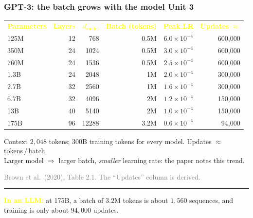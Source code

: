 \documentclass[12pt]{beamer}
\newcommand{\FrameTitle}[2]{\frametitle{#1 \hfill \small\textnormal{\textcolor{midgray}{#2}}}}
\begin{document}
\begin{frame}\FrameTitle{GPT-3: the batch grows with the model}{Unit 3}
    \centering\footnotesize
    \begin{tabular}{@{}lrrrrr@{}}
        \textcolor{yellow}{\textbf{Parameters}} & \textcolor{yellow}{\textbf{Layers}} & \textcolor{yellow}{\textbf{$d_{\text{model}}$}} &
        \textcolor{yellow}{\textbf{Batch (tokens)}} & \textcolor{yellow}{\textbf{Peak LR}} & \textcolor{yellow}{\textbf{Updates $\approx$}}\\[0.5mm]
        125M & 12 & 768   & 0.5M & $6.0\times10^{-4}$ & 600{,}000\\
        350M & 24 & 1024  & 0.5M & $3.0\times10^{-4}$ & 600{,}000\\
        760M & 24 & 1536  & 0.5M & $2.5\times10^{-4}$ & 600{,}000\\
        1.3B & 24 & 2048  & 1M   & $2.0\times10^{-4}$ & 300{,}000\\
        2.7B & 32 & 2560  & 1M   & $1.6\times10^{-4}$ & 300{,}000\\
        6.7B & 32 & 4096  & 2M   & $1.2\times10^{-4}$ & 150{,}000\\
        13B  & 40 & 5140  & 2M   & $1.0\times10^{-4}$ & 150{,}000\\
        175B & 96 & 12288 & 3.2M & $0.6\times10^{-4}$ & 94{,}000
    \end{tabular}
    \par%
    \begin{flushleft}\small
        Context $2{,}048$ tokens; $300$B training tokens for every model. Updates $\approx$ tokens\,/\,batch.\\
        Larger model $\Rightarrow$ larger batch, \emph{smaller} learning rate: the paper notes this trend.
    \end{flushleft}
    {\par\vspace{1mm}\footnotesize\textcolor{gray}{
            Brown et al.\ (2020), Table 2.1.
            The ``Updates'' column is derived.}\par}
    \vfill
    {\color{yellow}\rule{\linewidth}{0.5pt}}\par\vspace{1mm}
    {\raggedright\small\textcolor{yellow}{\textbf{In an LLM:}}
        at 175B, a batch of $3.2$M tokens is about $1{,}560$
        sequences, and training is only about $94{,}000$
        updates.\par}
\end{frame}
\end{document}
